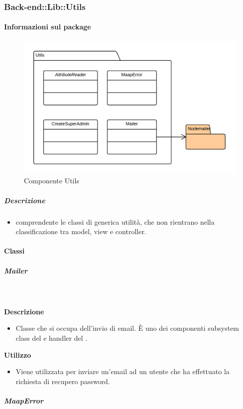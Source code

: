 	\subsubsection{Back-end::Lib::Utils}
	\paragraph{Informazioni sul package} 
		\begin{figure}[H] 
			\begin{center} 
				\includegraphics[width=\textwidth]{uml/package/Back-end::Lib::Utils.png}  
				\caption{Componente Utils}
			\end{center}  
		\end{figure} 
	\subparagraph{Descrizione} 
		\begin{itemize}
		\item[]  comprendente le classi di generica utilità, che non rientrano nella classificazione tra model, view e controller.
		\end{itemize} 
		\paragraph{Classi}
			\subparagraph{Mailer}
				
				\textbf{\\ \\ Descrizione} 
					\begin{itemize}
						\item[] Classe che si occupa dell'invio di email. È uno dei componenti subsystem class del   e handler del  .
					\end{itemize}      
				\textbf{Utilizzo}  
					\begin{itemize}
						\item[] Viene utilizzata per inviare un'email ad un utente che ha effettuato la richiesta di recupero password.
					\end{itemize}
			\subparagraph{MaapError}
				
